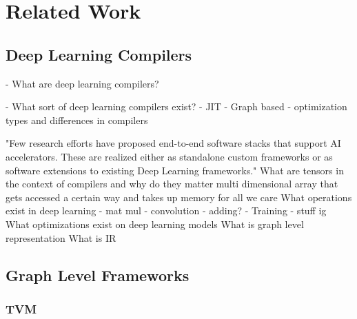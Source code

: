 
\chapter{Related Work} %

\label{Chapter2} %

\section{Deep Learning Compilers}

- What are deep learning compilers?

- What sort of deep learning compilers exist?
	- JIT
	- Graph based
	- optimization types and differences in compilers

"Few research efforts have proposed end-to-end software stacks that support AI accelerators. 
These are realized either as standalone custom frameworks or as software extensions to existing Deep Learning
frameworks." \cite{onsram}
What are tensors in the context of compilers and why do they matter
	multi dimensional array that gets accessed a certain way and takes up memory for all we care
What operations exist in deep learning
- mat mul
- convolution
- adding?
- Training
- stuff ig
What optimizations exist on deep learning models
What is graph level representation
What is IR 



\section{Graph Level Frameworks}


\subsection{TVM}


